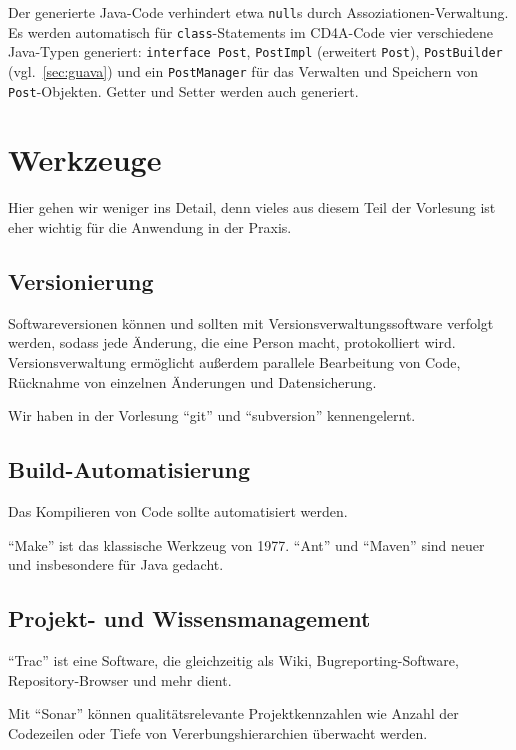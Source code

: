 \documentclass[a4paper,parskip=half*,DIV=7,fontsize=11pt]{scrartcl}
\begin{document}
Der generierte Java-Code verhindert etwa \lstinline{null}s durch Assoziationen-Verwaltung. Es werden automatisch für \lstinline{class}-Statements im CD4A-Code vier verschiedene Java-Typen generiert: \lstinline{interface Post}, \lstinline{PostImpl} (erweitert \lstinline{Post}), \lstinline{PostBuilder} (vgl.~\ref{sec:guava}) und ein \lstinline{PostManager} für das Verwalten und Speichern von \lstinline{Post}-Objekten. Getter und Setter werden auch generiert.

\section{Werkzeuge}

Hier gehen wir weniger ins Detail, denn vieles aus diesem Teil der Vorlesung ist eher wichtig für die Anwendung in der Praxis.

\subsection{Versionierung}

Softwareversionen können und sollten mit Versionsverwaltungssoftware verfolgt werden, sodass jede Änderung, die eine Person macht, protokolliert wird. Versionsverwaltung ermöglicht außerdem parallele Bearbeitung von Code, Rücknahme von einzelnen Änderungen und Datensicherung.

Wir haben in der Vorlesung ``git'' und ``subversion'' kennengelernt.

\subsection{Build-Automatisierung}

Das Kompilieren von Code sollte automatisiert werden.

``Make'' ist das klassische Werkzeug von 1977. ``Ant'' und ``Maven'' sind neuer und insbesondere für Java gedacht.

\subsection{Projekt- und Wissensmanagement}

``Trac'' ist eine Software, die gleichzeitig als Wiki, Bugreporting-Software, Repository-Browser und mehr dient.

Mit ``Sonar'' können qualitätsrelevante Projektkennzahlen wie Anzahl der Codezeilen oder Tiefe von Vererbungshierarchien überwacht werden.
\end{document}
